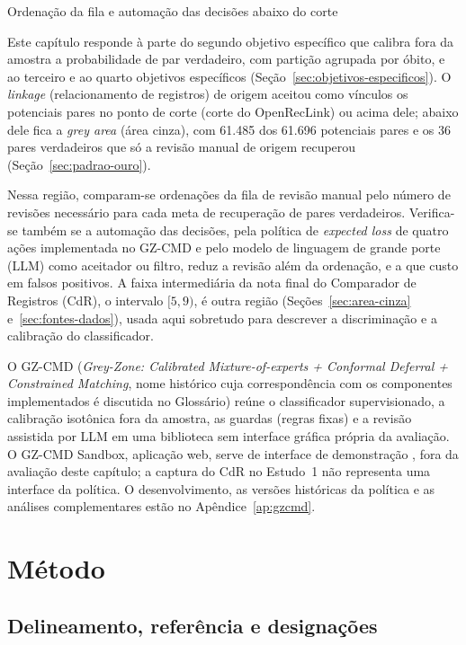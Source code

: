 \begin{chapter}{Ordenação da fila e automação das decisões abaixo do corte}\label{cap:estudo4}

Este capítulo responde à parte do segundo objetivo específico que calibra fora da amostra a probabilidade de par verdadeiro, com partição agrupada por óbito, e ao terceiro e ao quarto objetivos específicos (Seção~\ref{sec:objetivos-especificos}). O \textit{linkage} (relacionamento de registros) de origem aceitou como vínculos os potenciais pares no ponto de corte (corte do OpenRecLink) ou acima dele; abaixo dele fica a \textit{grey area} (área cinza), com 61.485 dos 61.696 potenciais pares e os 36 pares verdadeiros que só a revisão manual de origem recuperou (Seção~\ref{sec:padrao-ouro}).

Nessa região, comparam-se ordenações da fila de revisão manual pelo número de revisões necessário para cada meta de recuperação de pares verdadeiros. Verifica-se também se a automação das decisões, pela política de \textit{expected loss} de quatro ações implementada no GZ-CMD e pelo modelo de linguagem de grande porte (LLM) como aceitador ou filtro, reduz a revisão além da ordenação, e a que custo em falsos positivos. A faixa intermediária da nota final do Comparador de Registros (CdR), o intervalo $[5,9)$, é outra região (Seções~\ref{sec:area-cinza} e~\ref{sec:fontes-dados}), usada aqui sobretudo para descrever a discriminação e a calibração do classificador.

O GZ-CMD (\textit{Grey-Zone: Calibrated Mixture-of-experts + Conformal Deferral + Constrained Matching}, nome histórico cuja correspondência com os componentes implementados é discutida no Glossário) reúne o classificador supervisionado, a calibração isotônica fora da amostra, as guardas (regras fixas) e a revisão assistida por LLM em uma biblioteca sem interface gráfica própria da avaliação. O GZ-CMD Sandbox, aplicação web, serve de interface de demonstração \cite{Jardim2026gzcmdweb}, fora da avaliação deste capítulo; a captura do CdR no Estudo~1 não representa uma interface da política. O desenvolvimento, as versões históricas da política e as análises complementares estão no Apêndice~\ref{ap:gzcmd}.

\section{Método}\label{sec:e4-metodo}

\subsection{Delineamento, referência e designações}\label{sec:e4-delineamento}


\end{chapter}
